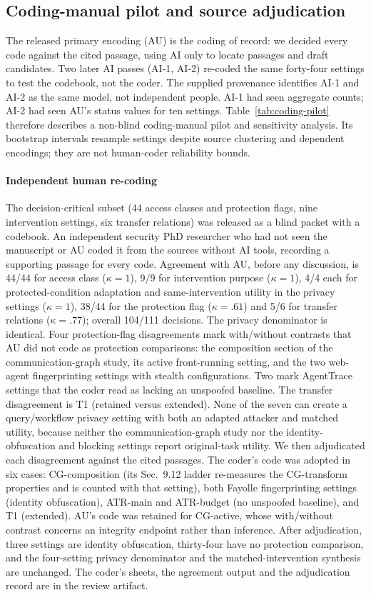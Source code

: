 \subsection{Coding-manual pilot and source adjudication}\label{supp:coding-pilot}
The released primary encoding (AU) is the coding of record: we decided every code against the cited passage, using AI only to locate passages and draft candidates. Two later AI passes (AI-1, AI-2) re-coded the same forty-four settings to test the codebook, not the coder. The supplied provenance identifies AI-1 and AI-2 as the same model, not independent people. AI-1 had seen aggregate counts; AI-2 had seen AU's status values for ten settings. Table~\ref{tab:coding-pilot} therefore describes a non-blind coding-manual pilot and sensitivity analysis. Its bootstrap intervals resample settings despite source clustering and dependent encodings; they are not human-coder reliability bounds. \paragraph{Independent human re-coding} The decision-critical subset (44 access classes and protection flags, nine intervention settings, six transfer relations) was released as a blind packet with a codebook. An independent security PhD researcher who had not seen the manuscript or AU coded it from the sources without AI tools, recording a supporting passage for every code. Agreement with AU, before any discussion, is 44/44 for access class ($\kappa=1$), 9/9 for intervention purpose ($\kappa=1$), 4/4 each for protected-condition adaptation and same-intervention utility in the privacy settings ($\kappa=1$), 38/44 for the protection flag ($\kappa=.61$) and 5/6 for transfer relations ($\kappa=.77$); overall 104/111 decisions. The privacy denominator is identical. Four protection-flag disagreements mark with/without contrasts that AU did not code as protection comparisons: the composition section of the communication-graph study, its active front-running setting, and the two web-agent fingerprinting settings with stealth configurations. Two mark AgentTrace settings that the coder read as lacking an unspoofed baseline. The transfer disagreement is T1 (retained versus extended). None of the seven can create a query/workflow privacy setting with both an adapted attacker and matched utility, because neither the communication-graph study nor the identity-obfuscation and blocking settings report original-task utility. We then adjudicated each disagreement against the cited passages. The coder's code was adopted in six cases: CG-composition (its Sec.~9.12 ladder re-measures the CG-transform properties and is counted with that setting), both Fayolle fingerprinting settings (identity obfuscation), ATR-main and ATR-budget (no unspoofed baseline), and T1 (extended). AU's code was retained for CG-active, whose with/without contrast concerns an integrity endpoint rather than inference. After adjudication, three settings are identity obfuscation, thirty-four have no protection comparison, and the four-setting privacy denominator and the matched-intervention synthesis are unchanged. The coder's sheets, the agreement output and the adjudication record are in the review artifact.

